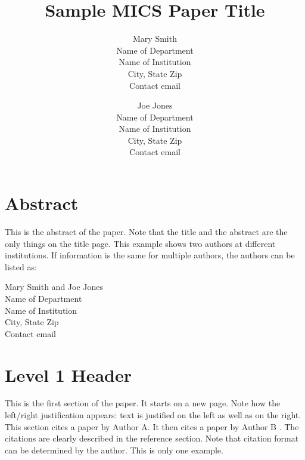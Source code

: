 \documentclass[12pt]{article}
\begin{document}
\pagestyle{plain}

\title{Sample MICS Paper Title}

\author{
Mary Smith\\
Name of Department\\
Name of Institution\\
City, State Zip\\
Contact email
\and
Joe Jones\\
Name of Department\\
Name of Institution\\
City, State Zip\\
Contact email
}
\date{} 

\maketitle
\thispagestyle{empty}

\section*{\centering Abstract}

This is the abstract of the paper.  Note that the title and the abstract are the only things on the title page.  This example shows two authors at different institutions.  If information is the same for multiple authors, the authors can be listed as:

\begin{center}
{\large
Mary Smith and Joe Jones\\
Name of Department\\
Name of Institution\\
City, State Zip\\
Contact email
}
\end{center}  

\newpage
\setcounter{page}{1}

\section{Level 1 Header}

This is the first section of the paper.  It starts on a new page.  Note how the left/right justification appears: text is justified on the left as well as on the right.  This section cites a paper by Author A.  It then cites a paper by Author B \cite{Pigeonhole}.  The citations are clearly described in the reference section.  Note that citation format can be determined by the author.  This is only one example.
\end{document}
